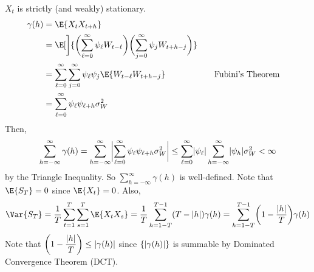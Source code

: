 \begin{Proof}{}{}
    $ X_t $ is strictly (and weakly) stationary.
    \begin{align*}
        \gamma(h)
         & =\E{X_t X_{t+h}}                                                                                                                                          \\
         & =\E[\bigg]{\biggl(\sum_{\ell=0}^{\infty} \psi_\ell W_{t-\ell}\biggr)\biggl(\sum_{j=0}^{\infty} \psi_j W_{t+h-j}\biggr)}                                   \\
         & =\sum_{\ell=0}^{\infty}\sum_{j=0}^{\infty} \psi_\ell\psi_j\E{W_{t-\ell}W_{t+h-j}}                                       & \quad & \text{Fubini's Theorem} \\
         & = \sum_{\ell=0}^{\infty} \psi_\ell \psi_{\ell+h}\sigma_W^2
    \end{align*}
    Then,
    \[ \sum_{h=-\infty}^{\infty} \gamma(h)=\sum_{h=-\infty}^{\infty}
        \abs[\bigg]{\sum_{\ell=0}^{\infty} \psi_\ell \psi_{\ell+h}\sigma_W^2}
        \le \sum_{\ell=0}^{\infty} \abs{\psi_\ell}\sum_{h=-\infty}^{\infty} \abs{\psi_h}\sigma_W^2<\infty \]
    by the Triangle Inequality.
    So $ \sum_{h=-\infty}^{\infty} \gamma(h) $ is well-defined.
    Note that $ \E{S_T}=0 $ since $ \E{X_t}=0 $. Also,
    \[ \Var{S_T}=\frac{1}{T} \sum_{t=1}^{T} \sum_{s=1}^{T} \E{X_t X_s}=
        \frac{1}{T} \sum_{h=1-T}^{T-1} (T-\abs{h})\gamma(h)=\sum_{h=1-T}^{T-1}
        \biggl(1-\frac{\abs{h}}{T} \biggr)\gamma(h) \]
    Note that $ \displaystyle \biggl(1-\frac{\abs{h}}{T} \biggr)\le \abs{\gamma(h)} $
    since $ \set{\abs{\gamma(h)}} $ is summable by Dominated Convergence Theorem (DCT).


\end{Proof}
